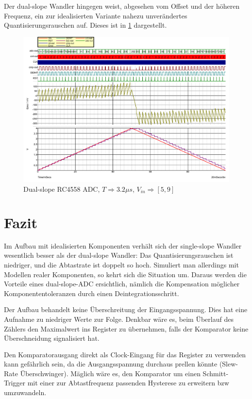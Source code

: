 \documentclass[
	ngerman,
	parskip=half,
	twocolumn,
	DIV=calc,
	]{scrartcl}
\begin{document}
		Der dual-slope Wandler hingegen weist, abgesehen vom Offset und der höheren Frequenz, ein zur idealisierten Variante nahezu unverändertes Quantisierungsrauschen auf. Dieses ist in \cref{fig:dual-slope-RC4558} dargestellt.
	
		\begin{figure}
			\centering
			\includegraphics[width=\linewidth]{RC4558_dual_slope}			
			\caption[Dual-slope RC4558 ADC]{Dual-slope RC4558 ADC, $T \Rightarrow 3.2\mu s$, $V_{in} \Rightarrow [5,  9]$}			
			\label{fig:dual-slope-RC4558}
		\end{figure}
	\section{Fazit}	
		Im Aufbau mit idealisierten Komponenten verhält sich der single-slope Wandler wesentlich besser als der dual-slope Wandler: Das Quantisierungsrauschen  ist niedriger, und die Abtastrate ist doppelt so hoch. Simuliert man allerdings mit Modellen realer Komponenten, so kehrt sich die Situation um. Daraus werden die Vorteile eines dual-slope-ADC ersichtlich, nämlich die Kompensation möglicher Komponententoleranzen durch einen Deintegrationsschritt.
		
		Der Aufbau behandelt keine Überschreitung der Eingangsspannung.  Dies hat eine Aufnahme zu niedriger Werte zur Folge. Denkbar wäre es, beim Überlauf des Zählers den Maximalwert ins Register zu übernehmen, falls der Komparator keine Überschneidung signalisiert hat. 
		
		Den Komparatorausgang direkt als Clock-Eingang für das Register zu verwenden kann gefährlich sein, da die Ausgangsspannung durchaus prellen könnte (Slew-Rate Überschwinger). Mäglich wäre es, den Komparator um einen Schmitt-Trigger\cite{website:schmitt_trigger_slewrate} mit einer zur Abtastfrequenz passenden Hysterese zu erweitern bzw umzuwandeln.
		
\end{document}
